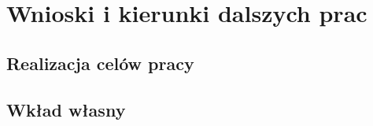 \chapter{Wnioski i kierunki dalszych prac}\label{ch:wnioski}


\section{Realizacja celów pracy}\label{sec:cele-zrealizowane}

%
%

\section{Wkład własny}\label{sec:wklad-wlasny}

%
%
%
%
%

